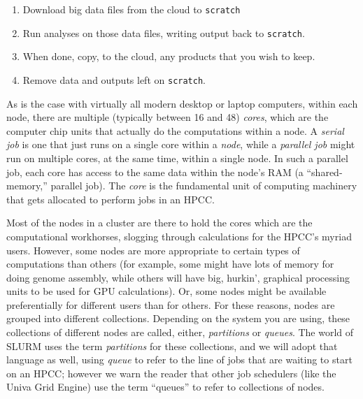 \documentclass[]{krantz}
\providecommand{\tightlist}{%
  \setlength{\itemsep}{0pt}\setlength{\parskip}{0pt}}
\begin{document}
\begin{enumerate}
\def\labelenumi{\arabic{enumi}.}
\tightlist
\item
  Download big data files from the cloud to \texttt{scratch}
\item
  Run analyses on those data files, writing output back to \texttt{scratch}.
\item
  When done, copy, to the cloud, any products that you wish to keep.
\item
  Remove data and outputs left on \texttt{scratch}.
\end{enumerate}

As is the case with virtually all modern desktop or laptop computers, within each node,
there are multiple (typically between 16 and 48) \emph{cores}, which are the computer chip units that actually
do the computations within a node. A \emph{serial job} is one that just runs on a single core
within a \emph{node}, while a \emph{parallel job} might run on multiple cores, at the same time, within
a single node. In such a parallel job, each core has access to the same data within the
node's RAM (a ``shared-memory,'' parallel job). The \emph{core}
is the fundamental unit of computing machinery that gets allocated to perform jobs in an HPCC.

Most of the nodes in a cluster are there to hold the cores which are the computational workhorses,
slogging through calculations for the HPCC's myriad users. However, some nodes
are more appropriate to certain types of computations than others (for example, some
might have lots of memory for doing genome assembly, while others will have
big, hurkin', graphical processing units to be used for GPU calculations). Or, some nodes
might be available preferentially for different users than for others. For these
reasons, nodes are grouped into different collections. Depending on the system you are
using, these collections of different nodes are called, either, \emph{partitions} or \emph{queues}.
The world of SLURM uses the term \emph{partitions} for these collections, and we will adopt
that language as well, using \emph{queue} to refer to the line of jobs that are waiting to start
on an HPCC; however we warn the reader that other job schedulers (like the Univa Grid Engine)
use the term ``queues'' to refer to collections of nodes.
\end{document}

